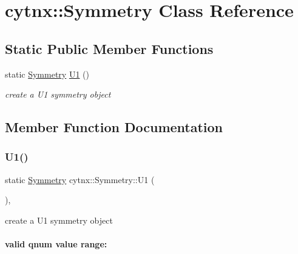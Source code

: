 \hypertarget{classcytnx_1_1Symmetry}{}\section{cytnx\+:\+:Symmetry Class Reference}
\label{classcytnx_1_1Symmetry}
\subsection*{Static Public Member Functions}
\begin{DoxyCompactItemize}
\item 
static \hyperlink{classcytnx_1_1Symmetry}{Symmetry} \hyperlink{classcytnx_1_1Symmetry_a9218fd66fc9cca64cd3d792e0019592a}{U1} ()
\begin{DoxyCompactList}\small\item\em create a U1 symmetry object \end{DoxyCompactList}\end{DoxyCompactItemize}


\subsection{Member Function Documentation}
\mbox{\label{classcytnx_1_1Symmetry_a9218fd66fc9cca64cd3d792e0019592a}} 
\subsubsection{\texorpdfstring{U1()}{U1()}}
{\footnotesize\ttfamily static \hyperlink{classcytnx_1_1Symmetry}{Symmetry} cytnx\+::\+Symmetry\+::\+U1 (\begin{DoxyParamCaption}{ }\end{DoxyParamCaption})\hspace{0.3cm}{\ttfamily [inline]}, {\ttfamily [static]}}



create a U1 symmetry object 

\paragraph*{valid qnum value range\+:}



